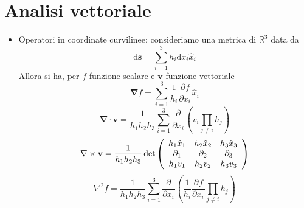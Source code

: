 \documentclass[a4paper,11pt]{book}
\newcommand{\dif}{\mathrm{d}}
\newcommand{\der}[3][]{\frac{\partial ^{#1}#2}{\partial {#3}^{#1}}}
\newcommand{\R}{\mathbb{R}}
\let\oldnabla\nabla
\renewcommand{\nabla}{\vec{\oldnabla}}
\newcommand{\lap}{\oldnabla^2}
\renewcommand{\vec}[1]{\mathbf{#1}}
\theoremstyle{theorem}
\theoremstyle{definition}
\begin{document}
\section{Analisi vettoriale}
\begin{itemize}
	\item Operatori in coordinate curvilinee: consideriamo una metrica di $\R^3$ data da 
	\[\dif \vec{s}=\sum_{i=1}^{3}h_i\dif x_i\hat{x}_i\]
	Allora si ha, per $f$ funzione scalare e $\vec{v}$ funzione vettoriale
	\[\nabla f=\sum_{i=1}^{3}\frac{1}{h_i}\der{f}{x_i}\hat{x}_i\]
	\[\nabla\cdot\vec{v}=\frac{1}{h_1h_2h_3}\sum_{i=1}^{3}\der{}{x_i}\left(v_i\prod_{j\neq i}h_j\right)\]
	\[\nabla\times\vec{v}=\frac{1}{h_1h_2h_3}\det\left(\begin{array}{c c c}
	h_1\hat{x}_1&h_2\hat{x}_2&h_3\hat{x}_3\\
	\partial_1&\partial_2&\partial_3\\
	h_1v_1&h_2v_2&h_3v_3
	\end{array}\right)\]
	\[\lap f=\frac{1}{h_1h_2h_3}\sum_{i=1}^{3}\der{}{x_i}\left(\frac{1}{h_i}\der{f}{x_i}\prod_{j\neq i}h_j\right)\]
\end{itemize}
\end{document}
